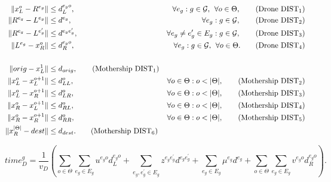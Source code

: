 \begin{align*}
\|x_L^o- R^{e_g}\| & \leq  d_L^{e_go},  &\forall e_g:g\in \mathcal{G}, \:\:\forall o\in \Theta, \tag{Drone DIST$_{1}$} \label{eq:drone-d1-async}\\
\|R^{e_g}- L^{e_g}\| & \leq  d^{e_g},  &\forall e_g:g\in \mathcal{G}, \tag{Drone DIST$_{2}$} \label{eq:drone-d2-async}\\
\|R^{e_g}- L^{e'_g}\| & \leq  d^{e_ge'_g}, &\forall e_g\neq e_g'\in E_g:g\in \mathcal{G}, \tag{Drone DIST$_{3}$} \label{eq:drone-d3-async}\\
\|L^{e_g}- x_R^o\| & \leq  d_R^{e_go}, &\forall e_g:g\in \mathcal{G},\:\:\forall o\in \Theta. \tag{Drone DIST$_{4}$} \label{eq:drone-d4-async}\\\\
\|orig - x_L^1\| & \leq d_{orig}, \tag{Mothership DIST$_1$}\label{eq:mothership-d1-async}\\
\|x_L^o - x_L^{o+1}\| & \leq d_{LL}^{o}, &\forall o\in\Theta:o<|\Theta|, \tag{Mothership DIST$_{2}$}\label{eq:mothership-d2-async}\\
\|x_L^o - x_R^{o+1}\| & \leq d_{LR}^{o}, &\forall o\in\Theta:o<|\Theta|, \tag{Mothership DIST$_{3}$}\label{eq:mothership-d3-async}\\
\|x_R^o - x_L^{o+1}\| & \leq d_{RL}^{o}, &\forall o\in\Theta:o<|\Theta|, \tag{Mothership DIST$_{4}$}\label{eq:mothership-d4-async}\\
\|x_R^o - x_R^{o+1}\| & \leq d_{RR}^{o}, &\forall o\in\Theta:o<|\Theta|, \tag{Mothership DIST$_{5}$}\label{eq:mothership-d5-async}\\
\|x_R^{|\Theta|} - dest\| & \leq d_{dest}. \tag{Mothership DIST$_6$}\label{eq:mothership-d6-async}
\end{align*}


\begin{footnotesize}
\begin{equation}\tag{Time$^g_D$}\label{eq:time-g-d}
time_D^g = \frac{1}{v_D}\left(\sum_{o \in \Theta}\sum_{e_g \in E_g} u^{e_g o}d_L^{e_g o} + \sum_{e_g, e^\prime_g\in E_g}z^{e_ge^\prime_g}d^{e_ge^\prime_g} + \sum_{e_g\in E_g} \mu^{e_g}d^{e_g} + \sum_{o \in \Theta}\sum_{e_g \in E_g} v^{e_g o}d_R^{e_g o}\right).
\end{equation}
\end{footnotesize}

